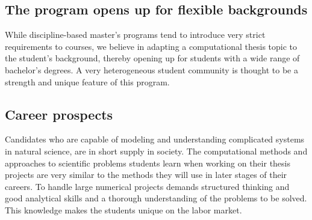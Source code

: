 \documentclass[%
oneside,                 %
final,                   %
10pt]{article}
\begin{document}
\subsection{The program opens up for flexible backgrounds}

\begin{block}{}
While discipline-based master's programs tend to introduce very strict
requirements to courses, we believe in adapting a computational thesis
topic to the student's background, thereby opening up for
students with a wide range of bachelor's degrees.
A very heterogeneous student community is thought to be a strength and
unique feature of this program.
\end{block}


\subsection{Career prospects}

\begin{block}{}
Candidates who are capable of modeling and understanding complicated
systems in natural science, are in short supply in society.  The
computational methods and approaches to scientific problems students learn
when working on their thesis projects are very similar to the methods
they will use in later stages of their careers.  To handle large
numerical projects demands structured thinking and good analytical
skills and a thorough understanding of the problems to be solved. This
knowledge makes the students unique on the labor market.


\end{block}












\end{document}
